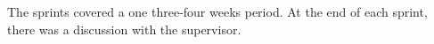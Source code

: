 \documentclass{scrartcl}
\begin{document}
  		
	The sprints covered a one three-four weeks period. At the end of each sprint, there was a discussion with the supervisor.
%
%
%
%
%
%
% 
%
%
%
%
%
% 
%
%
% 
%
% 
% 
%
\end{document}
